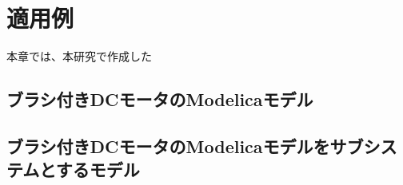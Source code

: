 \chapter{適用例}\label{cha:Indication}
本章では、本研究で作成した


\section{ブラシ付きDCモータのModelicaモデル}


\section{ブラシ付きDCモータのModelicaモデルをサブシステムとするモデル}
